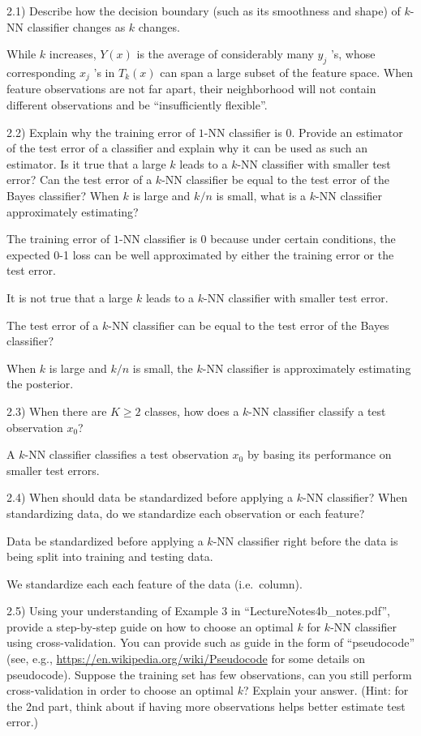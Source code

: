 \documentclass[
  11pt,
]{article}
\begin{document}
2.1) Describe how the decision boundary (such as its smoothness and
shape) of \(k\)-NN classifier changes as \(k\) changes.

While \(k\) increases, \(Y(x)\) is the average of considerably many
\(y_j\) 's, whose corresponding \(x_j\) 's in \(T_k(x)\) can span a
large subset of the feature space. When feature observations are not far
apart, their neighborhood will not contain different observations and be
``insufficiently flexible''.

2.2) Explain why the training error of \(1\)-NN classifier is \(0\).
Provide an estimator of the test error of a classifier and explain why
it can be used as such an estimator. Is it true that a large \(k\) leads
to a \(k\)-NN classifier with smaller test error? Can the test error of
a \(k\)-NN classifier be equal to the test error of the Bayes
classifier? When \(k\) is large and \(k/n\) is small, what is a \(k\)-NN
classifier approximately estimating?

The training error of \(1\)-NN classifier is \(0\) because under certain
conditions, the expected 0-1 loss can be well approximated by either the
training error or the test error.

It is not true that a large \(k\) leads to a \(k\)-NN classifier with
smaller test error.

The test error of a \(k\)-NN classifier can be equal to the test error
of the Bayes classifier?

When \(k\) is large and \(k/n\) is small, the \(k\)-NN classifier is
approximately estimating the posterior.

2.3) When there are \(K \ge 2\) classes, how does a \(k\)-NN classifier
classify a test observation \(x_0\)?

A \(k\)-NN classifier classifies a test observation \(x_0\) by basing
its performance on smaller test errors.

2.4) When should data be standardized before applying a \(k\)-NN
classifier? When standardizing data, do we standardize each observation
or each feature?

Data be standardized before applying a \(k\)-NN classifier right before
the data is being split into training and testing data.

We standardize each each feature of the data (i.e.~column).

2.5) Using your understanding of Example 3 in
``LectureNotes4b\_notes.pdf'', provide a step-by-step guide on how to
choose an optimal \(k\) for \(k\)-NN classifier using cross-validation.
You can provide such as guide in the form of ``pseudocode'' (see, e.g.,
\url{https://en.wikipedia.org/wiki/Pseudocode} for some details on
pseudocode). Suppose the training set has few observations, can you
still perform cross-validation in order to choose an optimal \(k\)?
Explain your answer. (Hint: for the 2nd part, think about if having more
observations helps better estimate test error.)
\end{document}
